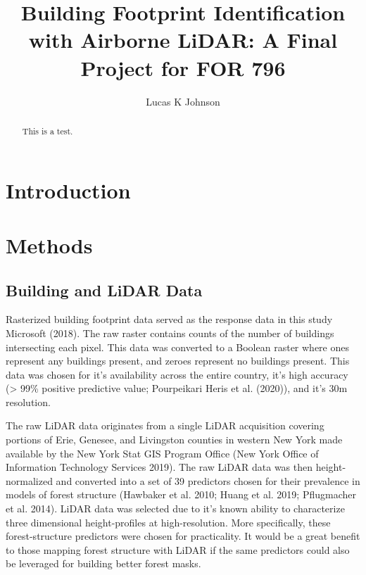 \documentclass[]{elsarticle} %
\begin{document}
\begin{frontmatter}

  \title{Building Footprint Identification with Airborne LiDAR: A Final Project for FOR 796}
    \author[]{Lucas K Johnson}
  
      
  \begin{abstract}
  This is a test.
  \end{abstract}
  
 \end{frontmatter}

\hypertarget{introduction}{%
\section{Introduction}\label{introduction}}

\hypertarget{methods}{%
\section{Methods}\label{methods}}

\hypertarget{building-and-lidar-data}{%
\subsection{Building and LiDAR Data}\label{building-and-lidar-data}}

Rasterized building footprint data served as the response data in this study
Microsoft (2018).
The raw raster contains counts of the number of buildings intersecting each
pixel.
This data was converted to a Boolean raster where ones represent any buildings
present, and zeroes represent no buildings present.
This data was chosen for it's availability across the entire country, it's high
accuracy (\textgreater{} 99\% positive predictive value; Pourpeikari Heris et al. (2020)), and it's 30m resolution.

The raw LiDAR data originates from a single LiDAR acquisition covering portions
of Erie, Genesee, and Livingston counties in western New York made available
by the New York Stat GIS Program Office (New York Office of Information Technology Services 2019).
The raw LiDAR data was then height-normalized and converted into a set of 39
predictors chosen for their prevalence in models of forest structure
(Hawbaker et al. 2010; Huang et al. 2019; Pflugmacher et al. 2014).
LiDAR data was selected due to it's known ability to characterize three
dimensional height-profiles at high-resolution.
More specifically, these forest-structure predictors were chosen for
practicality.
It would be a great benefit to those mapping forest structure with LiDAR if the
same predictors could also be leveraged for building better forest masks.
\end{document}
